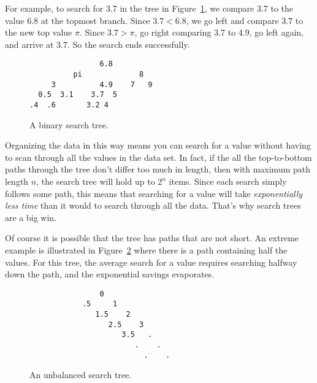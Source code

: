 For example, to search for 3.7 in the tree in Figure~\ref{searchtree1},
we compare 3.7 to the value 6.8 at the topmost branch.  Since $3.7 <
6.8$, we go left and compare $3.7$ to the new top value $\pi$.  Since
$3.7 > \pi$, go right comparing 3.7 to 4.9, go left again, and arrive
at 3.7. So the search ends successfully.

\begin{figure}

\begin{center}
\begin{verbatim}
                6.8
          pi             8  
     3          4.9    7   9 
  0.5  3.1    3.7  5
.4  .6       3.2 4 
\end{verbatim}
\end{center}

\caption{A binary search tree.}

\label{searchtree1}

\end{figure}

Organizing the data in this way means you can search for a value
without having to scan through all the values in the data set.  In
fact, if the all the top-to-bottom paths through the tree don't differ
too much in length, then with maximum path length $n$, the search tree
will hold up to $2^n$ items.  Since each search simply follows some
path, this means that searching for a value will take
\emph{exponentially less time} than it would to search through all the
data.  That's why search trees are a big win.

Of course it is possible that the tree has paths that are not short.
An extreme example is illustrated in Figure~\ref{unbalanced} where
there is a path containing half the values.  For this tree, the
average search for a value requires searching halfway down the path,
and the exponential savings evaporates.

\begin{figure}

\begin{center}
\begin{verbatim}
                0
            .5     1
               1.5    2
                  2.5    3
                     3.5   .
                        .    .
                          .    .
\end{verbatim}   
\end{center}

\caption{An unbalanced search tree.}

\label{unbalanced}

\end{figure}

